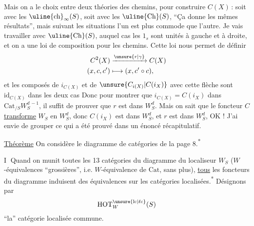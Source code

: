 Mais on a le choix entre deux théories des chemins, pour construire $C(X)$\,: soit avec les $\text{\uline{ch}}_{\infty}(S)$, soit avec les $\text{\uline{Ch}}(S)$, ``Ça donne les mêmes résultats'', mais suivant les situations l'un est plus commode que l'autre. Je vais travailler avec  $\text{\uline{Ch}}(S)$, auquel cas les $1_s$ sont  unités à gauche et à droite,  et on a une loi de composition pour les chemins. Cette loi nous permet de définir
\[
 \begin{aligned}
 C^2(X)&\xrightarrow{\unsure{r|\gamma}}C(X)\\
 (x,c,c')&\longmapsto(x,c'\circ c),
 \end{aligned}
\]
et les composés de $i_{C(X)}$ et de $\unsure{C_{i(X)}|C(i_X)}$ avec cette flèche sont $\mathrm{id}_{C(X)}$ dans les deux cas
Donc pour montrer que $i_{C(X)}=C(i_X)$ dans $\mathrm{Cat}_{/S}W_S^{d\, -1}$, il suffit de prouver que $r$ est dans $W_S^d$. Mais on sait que le foncteur $C$ \uline{transforme} $W_S$ en $W_S^d$, donc $C(i_X)$ est dans $W_S^d$, et   $r$ est dans $W_S^d$, OK !
J'ai envie de grouper ce qui a été prouvé dans un énoncé récapitulatif.

\uline{Théorème} \quad On considère le diagramme de catégories de la page 8.\textsuperscript{*}

\textcircled{I} Quand on munit toutes les 13 catégories du diagramme du localiseur $W_S$ ($W$-équivalences ``grossières'', i.e. $W$-équivalence de $\mathrm{Cat}$, sans plus), \uline{tous} les foncteurs du diagramme induisent des équivalences sur les catégories localisées.\textsuperscript{*}
Désignons par
\[
 \mathrm{HOT}^{\unsure{\mathrm{lc}|\ell\mathrm{c}}}_W(S)
\]
``la'' catégorie localisée commune.

